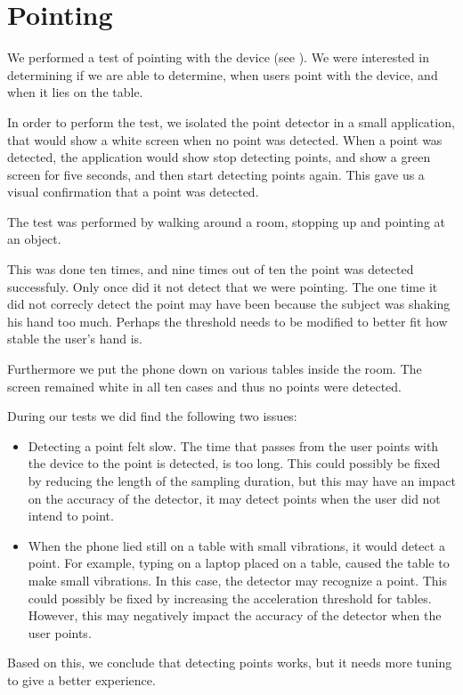 \section{Pointing}
\label{sec:evaluation:pointing}

We performed a test of pointing with the device (see ).
We were interested in determining if we are able to determine, 
when users point with the device, 
and when it lies on the table.

In order to perform the test, 
we isolated the point detector in a small application, 
that would show a white screen when no point was detected. 
When a point was detected, 
the application would show stop detecting points, 
and show a green screen for five seconds, 
and then start detecting points again.
This gave us a visual confirmation that a point was detected.

The test was performed by walking around a room, 
stopping up and pointing at an object. 

This was done ten times, and nine times out of ten the point was detected successfuly. Only once did it not detect that we were pointing.
The one time it did not correcly detect the point may have been because the subject was shaking his hand too much.
Perhaps the threshold needs to be modified to better fit how stable the user's hand is.

Furthermore we put the phone down on various tables inside the room. 
The screen remained white in all ten cases and thus no points were detected.

During our tests we did find the following two issues:
\begin{itemize}
\item Detecting a point felt slow. The time that passes from the user points with the device to the point is detected, is too long. This could possibly be fixed by reducing the length of the sampling duration, but this may have an impact on the accuracy of the detector, \ie it may detect points when the user did not intend to point.
\item When the phone lied still on a table with small vibrations, it would detect a point. For example, typing on a laptop placed on a table, caused the table to make small vibrations. In this case, the detector may recognize a point. This could possibly be fixed by increasing the acceleration threshold for tables. However, this may negatively impact the accuracy of the detector when the user points.
\end{itemize}

Based on this, we conclude that detecting points works, 
but it needs more tuning to give a better experience. 

